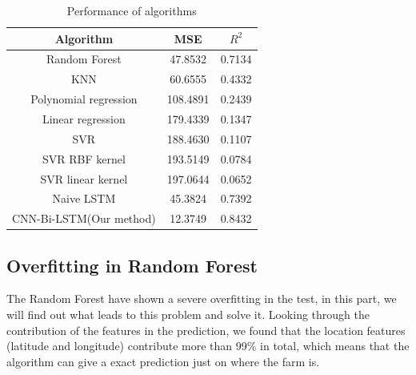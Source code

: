 \documentclass[conference, a4paper]{IEEEtran}
\begin{document}
  \begin{table}[htbp]
    \caption{Performance of algorithms}
    \begin{center}
    \begin{tabular}{|c|c|c|}
    \hline
    Algorithm                                    & MSE      & $R^2$\\
    \hline
    Random Forest \cite{liawClassificationRegressionRandomForest2002}                      &    47.8532  & 0.7134\\
    KNN \cite{petersonKnearestNeighbor2009}                                         & 60.6555 & 0.4332\\
    Polynomial regression & 108.4891 & 0.2439\\
    Linear regression   & 179.4339 & 0.1347\\
    SVR \cite{druckerSupportVectorRegression1997}                                     & 188.4630 & 0.1107\\
    SVR RBF kernel \cite{cristianiniIntroductionSupportVector2000}                         & 193.5149 & 0.0784\\
    SVR linear kernel \cite{cristianiniIntroductionSupportVector2000}                      & 197.0644 & 0.0652\\
    \hline
    Naive LSTM    & 45.3824    &  0.7392\\
    CNN-Bi-LSTM(Our method) & 12.3749 & 0.8432\\
    \hline
    \end{tabular}
    \label{tab:result}
    \end{center}
  \end{table}


\subsection{Overfitting in Random Forest}
  The Random Forest have shown a severe overfitting in the test, in this part, we will find out what leads to this problem and solve it.  Looking through the contribution of the features in the prediction, we found that the location features (latitude and longitude) contribute more than 99\% in total, which means that the algorithm can give a exact prediction just on where the farm is.
\end{document}
